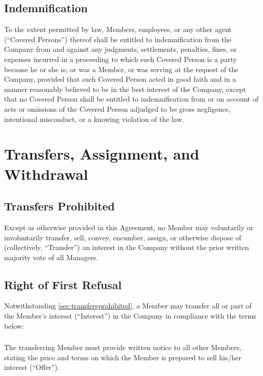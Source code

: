 \documentclass[11pt,onecolumn]{article}
\begin{document}
\subsection{Indemnification}

To the extent permitted by law, Members, employees, or any other agent (``Covered Persons'') thereof shall be entitled to indemnification from the Company from and against any judgments, settlements, penalties, fines, or expenses incurred in a proceeding to which such Covered Person is a party because he or she is, or was a Member, or was serving at the request of the Company, provided that such Covered Person acted in good faith and in a manner reasonably believed to be in the best interest of the Company, except that no Covered Person shall be entitled to indemnification from or on account of acts or omissions of the Covered Person adjudged to be gross negligence, intentional misconduct, or a knowing violation of the law.

\section{Transfers, Assignment, and Withdrawal} \label{sec:transfersassignmentandwithdrawal}

\subsection{Transfers Prohibited} \label{sec:transfersprohibited}

Except as otherwise provided in this Agreement, no Member may voluntarily or involuntarily transfer, sell, convey, encumber, assign, or otherwise dispose of (collectively, ``Transfer'') an interest in the Company without the prior written majority vote of all Managers.

\subsection{Right of First Refusal} \label{sec:rightoffirstrefusal}

Notwithstanding \autoref{sec:transfersprohibited}, a Member may transfer all or part of the Member's interest (``Interest'') in the Company in compliance with the terms below:

\subsubsection{}

The transferring Member must provide written notice to all other Members, stating the price and terms on which the Member is prepared to sell his/her interest (``Offer'').
\end{document}
